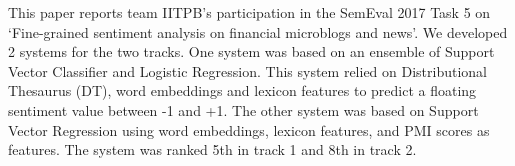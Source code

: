 This paper reports team IITPB's participation in the SemEval 2017 Task 5 on `Fine-grained sentiment analysis on financial microblogs and news'. We developed 2 systems for the two tracks. One system was based on an ensemble of Support Vector Classifier and Logistic Regression. This system relied on Distributional Thesaurus (DT), word embeddings and lexicon features to predict a floating sentiment value between -1 and +1. The other system was based on Support Vector Regression using word embeddings, lexicon features, and PMI scores as features. The system was ranked 5th in track 1 and 8th in track 2.
